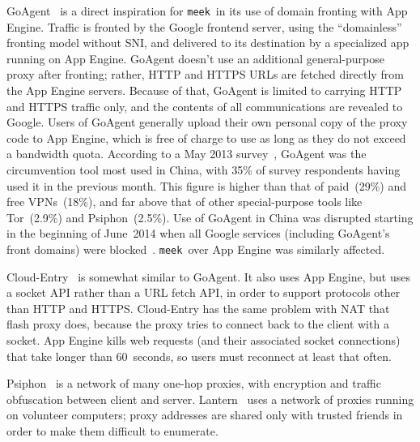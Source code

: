 \documentclass[conference]{IEEEtran}
\newcommand{\meek}{\texttt{meek}\xspace}
\begin{document}
GoAgent~\cite{goagent} is a direct inspiration for \meek\ in its use of
domain fronting with App Engine.
Traffic is fronted by the Google frontend server,
using the ``domainless'' fronting model without SNI,
and delivered to its destination by a specialized app running on App Engine.
GoAgent doesn't use an additional general-purpose proxy after fronting;
rather, HTTP and HTTPS URLs are fetched directly from the App Engine servers.
Because of that, GoAgent is limited to carrying HTTP and HTTPS traffic only,
and the contents of all communications are revealed to Google.
Users of GoAgent generally upload their own personal copy of the proxy code to App Engine,
which is free of charge to use as long as they do not exceed a bandwidth quota.
According to a May 2013 survey~\cite{collateral-freedom},
GoAgent was the circumvention tool most used in
China, with 35\% of survey respondents having used it in the previous month.
This figure is higher than that of paid~(29\%) and free VPNs~(18\%), and far
above that of other special-purpose tools like Tor~(2.9\%) and Psiphon~(2.5\%).
Use of GoAgent in China was disrupted starting in the beginning of June~2014
when all Google services (including GoAgent's front domains) were blocked~\cite{cn-google-block}.
\meek\ over App Engine was similarly affected.

Cloud-Entry~\cite{cloud-entry} is somewhat similar to GoAgent.
It also uses App Engine, but uses a socket API rather than a URL fetch API,
in order to support protocols other than HTTP and HTTPS.
Cloud-Entry has the same problem with NAT that flash proxy does,
because the proxy tries to connect back to the client with a socket.
App Engine kills web requests (and their associated socket connections)
that take longer than 60~seconds,
so users must reconnect at least that often.

Psiphon~\cite{psiphon} is a network of many one-hop proxies,
with encryption and traffic obfuscation between client and server.
Lantern~\cite{lantern} uses a network of proxies running on volunteer computers;
proxy addresses are shared only with trusted friends in order to make them difficult to enumerate.

\end{document}
